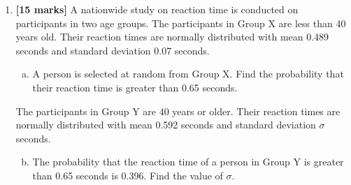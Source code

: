 \documentclass[12pt, twoside]{article}
\begin{document}
\begin{enumerate}
A line $L$ has vector equation $\mathbf{r} = \begin{pmatrix} 2 \\ 0 \\ -5 \end{pmatrix} + t\begin{pmatrix} 1 \\ -2 \\ 2 \end{pmatrix}$. The point C$(5, y, 1)$ lies on line $L$.

\begin{enumerate}[(a)]
    \setcounter{enumii}{1}
    \item \begin{enumerate}[(i)]
        \item Find the value of $y$.
        \item Show that $\overrightarrow{\mathrm{AC}} = \begin{pmatrix} 8 \\ -10 \\ -1 \end{pmatrix}$.
    \end{enumerate}
    \item Find the angle between $\overrightarrow{\mathrm{AB}}$ and $\overrightarrow{\mathrm{AC}}$.
    \item Find the area of triangle ABC.
\end{enumerate}

\vspace{1cm}

\item \textbf{[15 marks]} A nationwide study on reaction time is conducted on participants in two age groups. The participants in Group X are less than 40 years old. Their reaction times are normally distributed with mean 0.489 seconds and standard deviation 0.07 seconds.

\begin{enumerate}[(a)]
    \item A person is selected at random from Group X. Find the probability that their reaction time is greater than 0.65 seconds.
\end{enumerate}

The participants in Group Y are 40 years or older. Their reaction times are normally distributed with mean 0.592 seconds and standard deviation $\sigma$ seconds.

\begin{enumerate}[(a)]
    \setcounter{enumii}{1}
    \item The probability that the reaction time of a person in Group Y is greater than 0.65 seconds is 0.396. Find the value of $\sigma$.
\end{enumerate}


\end{enumerate}
\end{document}
